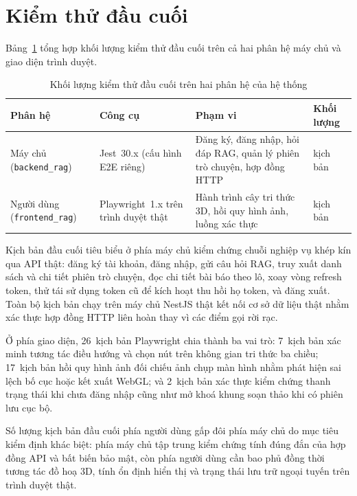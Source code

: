 \section{Kiểm thử đầu cuối}
\label{sec:e2e-testing}

Bảng~\ref{tab:khoi-luong-e2e} tổng hợp khối lượng kiểm thử đầu cuối trên cả hai phân hệ máy chủ và giao diện trình duyệt.

\begin{table}[htbp]
\centering
\caption{Khối lượng kiểm thử đầu cuối trên hai phân hệ của hệ thống}
\label{tab:khoi-luong-e2e}
\small
\begin{tabularx}{\textwidth}{
  >{\raggedright\arraybackslash}p{3.4cm}
  >{\raggedright\arraybackslash}p{3.4cm}
  >{\raggedright\arraybackslash}X
  >{\raggedleft\arraybackslash}p{2.3cm}
}
\toprule
\textbf{Phân hệ} & \textbf{Công cụ} & \textbf{Phạm vi} & \textbf{Khối lượng} \\
\midrule
Máy chủ (\texttt{backend\_rag}) & Jest~30.x (cấu hình E2E riêng) & Đăng ký, đăng nhập, hỏi đáp RAG, quản lý phiên trò chuyện, hợp đồng HTTP & 13 kịch bản \\
\midrule
Người dùng (\texttt{frontend\_rag}) & Playwright~1.x trên trình duyệt thật & Hành trình cây tri thức 3D, hồi quy hình ảnh, luồng xác thực & 26 kịch bản \\
\bottomrule
\end{tabularx}
\end{table}

Kịch bản đầu cuối tiêu biểu ở phía máy chủ kiểm chứng chuỗi nghiệp vụ khép kín qua API thật: đăng ký tài khoản, đăng nhập, gửi câu hỏi RAG, truy xuất danh sách và chi tiết phiên trò chuyện, đọc chi tiết bài báo theo lô, xoay vòng refresh token, thử tái sử dụng token cũ để kích hoạt thu hồi họ token, và đăng xuất. Toàn bộ kịch bản chạy trên máy chủ NestJS thật kết nối cơ sở dữ liệu thật nhằm xác thực hợp đồng HTTP liên hoàn thay vì các điểm gọi rời rạc.

Ở phía giao diện, 26~kịch bản Playwright chia thành ba vai trò: 7~kịch bản xác minh tương tác điều hướng và chọn nút trên không gian tri thức ba chiều; 17~kịch bản hồi quy hình ảnh đối chiếu ảnh chụp màn hình nhằm phát hiện sai lệch bố cục hoặc kết xuất WebGL; và 2~kịch bản xác thực kiểm chứng thanh trạng thái khi chưa đăng nhập cũng như mở khoá khung soạn thảo khi có phiên lưu cục bộ.

Số lượng kịch bản đầu cuối phía người dùng gấp đôi phía máy chủ do mục tiêu kiểm định khác biệt: phía máy chủ tập trung kiểm chứng tính đúng đắn của hợp đồng API và bất biến bảo mật, còn phía người dùng cần bao phủ đồng thời tương tác đồ hoạ 3D, tính ổn định hiển thị và trạng thái lưu trữ ngoại tuyến trên trình duyệt thật.

